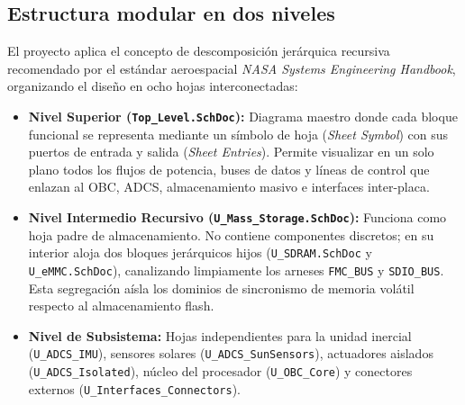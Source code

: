 \documentclass[11pt,a4paper]{article}
\begin{document}
\subsection{Estructura modular en dos niveles}
El proyecto aplica el concepto de descomposición jerárquica recursiva recomendado por el estándar aeroespacial \emph{NASA Systems Engineering Handbook}, organizando el diseño en ocho hojas interconectadas:
\begin{itemize}
    \item \textbf{Nivel Superior (\texttt{Top\_Level.SchDoc}):} Diagrama maestro donde cada bloque funcional se representa mediante un símbolo de hoja (\emph{Sheet Symbol}) con sus puertos de entrada y salida (\emph{Sheet Entries}). Permite visualizar en un solo plano todos los flujos de potencia, buses de datos y líneas de control que enlazan al OBC, ADCS, almacenamiento masivo e interfaces inter-placa.
    \item \textbf{Nivel Intermedio Recursivo (\texttt{U\_Mass\_Storage.SchDoc}):} Funciona como hoja padre de almacenamiento. No contiene componentes discretos; en su interior aloja dos bloques jerárquicos hijos (\texttt{U\_SDRAM.SchDoc} y \texttt{U\_eMMC.SchDoc}), canalizando limpiamente los arneses \texttt{FMC\_BUS} y \texttt{SDIO\_BUS}. Esta segregación aísla los dominios de sincronismo de memoria volátil respecto al almacenamiento flash.
    \item \textbf{Nivel de Subsistema:} Hojas independientes para la unidad inercial (\texttt{U\_ADCS\_IMU}), sensores solares (\texttt{U\_ADCS\_SunSensors}), actuadores aislados (\texttt{U\_ADCS\_Isolated}), núcleo del procesador (\texttt{U\_OBC\_Core}) y conectores externos (\texttt{U\_Interfaces\_Connectors}).
\end{itemize}
\end{document}
